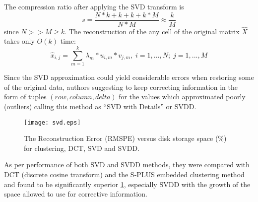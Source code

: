 The compression ratio after applying the SVD transform is 
\begin{equation}
s = \frac{N*k + k + k + k*M}{N*M} \approx \frac{k}{M}
\label{eq:svd_compression}
\end{equation}
since $N >> M \geq k$. The reconstruction of the any cell of the original matrix $\hat{X}$ takes only $O(k)$ time:
\begin{equation}
\hat{x}_{i,j}  = \sum_{m=1}^{k} \lambda_{m} * u_{i,m} * v_{j,m},\; i=1,...,N;\; j=1,...,M
\label{eq:svd_reconstruct}
\end{equation}

Since the SVD approximation could yield considerable errors when restoring some of the original data, authors suggesting to keep correcting information in the form of tuples $(row,column,delta)$ for the values which approximated poorly (outliers) calling this method as ``SVD with Details'' or SVDD. 

\begin{figure}[tbp]
   \centering
   \texttt{[image: svd.eps]}
   \caption{The Reconstruction Error (RMSPE) versus disk storage space (\%) for clustering, DCT, SVD and SVDD.}
   \label{fig:svd_benchmark}
\end{figure} 

As per performance of both SVD and SVDD methods, they were compared with DCT (discrete cosine transform) and the S-PLUS embedded clustering method and found to be significantly superior \ref{fig:svd_benchmark}, especially SVDD with the growth of the space allowed to use for corrective information.